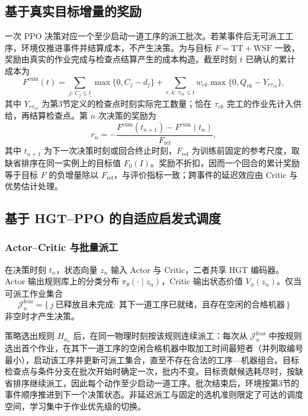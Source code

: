 \documentclass[12pt,a4paper]{article}
\newcommand{\cJ}{\mathcal{J}}
\newcommand{\cum}{\mathrm{cum}}
\begin{document}
\subsection{基于真实目标增量的奖励}

一次 PPO 决策对应一个至少启动一道工序的派工批次。若某事件后无可派工工序，环境仅推进事件并结算成本，不产生决策。为与目标 $F=\mathrm{TT}+\mathrm{WSF}$ 一致，奖励由真实的作业完成与检查点结算产生的成本构造。截至时刻 $t$ 已确认的累计成本为
\begin{equation}\label{eq:cum}
  F^{\cum}(t)=\sum_{j:\,C_j\le t}\max\{0,C_j-d_j\}+\sum_{r,k:\,\tau_{rk}\le t}w_{rk}\max\{0,Q_{rk}-Y_{r\tau_{rk}}\},
\end{equation}
其中 $Y_{r\tau_{rk}}$ 为第3节定义的检查点时刻实际完工数量；恰在 $\tau_{rk}$ 完工的作业先计入供给，再结算检查点。第 $n$ 次决策的奖励为
\begin{equation}\label{eq:rew}
  r_n=-\frac{F^{\cum}(t_{n+1})-F^{\cum}(t_n)}{F_{\mathrm{ref}}},
\end{equation}
其中 $t_{n+1}$ 为下一次决策时刻或回合终止时刻，$F_{\mathrm{ref}}$ 为训练前固定的参考尺度，取缺省排序在同一实例上的目标值 $F_0(I)$。奖励不折扣，因而一个回合的累计奖励等于目标 $F$ 的负增量除以 $F_{\mathrm{ref}}$，与评价指标一致；跨事件的延迟效应由 Critic 与优势估计处理。

\subsection{基于 HGT--PPO 的自适应启发式调度}

\subsubsection{Actor--Critic 与批量派工}

在决策时刻 $t_n$，状态向量 $z_n$ 输入 Actor 与 Critic，二者共享 HGT 编码器。Actor 输出规则库上的分类分布 $\pi_\theta(\cdot\mid z_n)$，Critic 输出状态价值 $V_\phi(z_n)$。仅当可派工作业集合
\begin{equation}\label{eq:feas}
  \cJ^{\mathrm{feas}}_n=\{\,j\ \text{已释放且未完成}:\ \text{其下一道工序已就绪，且存在空闲的合格机器}\,\}
\end{equation}
非空时才产生决策。

策略选出规则 $H_{a_n}$ 后，在同一物理时刻按该规则连续派工：每次从 $\cJ^{\mathrm{feas}}_n$ 中按规则选出首个作业，在其下一道工序的空闲合格机器中取加工时间最短者（并列取编号最小），启动该工序并更新可派工集合，直至不存在合法的工序—机器组合。目标检查点与条件分支在批次开始时确定一次，批内不变。目标贡献候选耗尽时，按缺省排序继续派工，因此每个动作至少启动一道工序。批次结束后，环境按第3节的事件顺序推进到下一个决策状态。非延迟派工与固定的选机准则限定了可达的调度空间，学习集中于作业优先级的切换。
\end{document}
